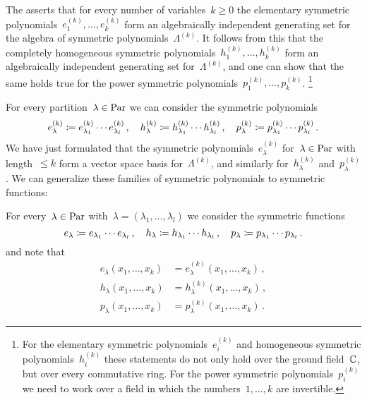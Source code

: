 \documentclass[a4paper,11pt]{scrartcl}
\begin{document}
The  asserts that for every number of variables~$k \geq 0$ the elementary symmetric polynomials~$e^{(k)}_1, \dotsc, e^{(k)}_k$ form an algebraically independent generating set for the algebra of symmetric polynomials~$\Lambda^{(k)}$.
It follows from this that the completely homogeneous symmetric polynomials~$h^{(k)}_1, \dotsc, h^{(k)}_k$ form an algebraically independent generating set for~$\Lambda^{(k)}$, and one can show that the same holds true for the power symmetric polynomials~$p^{(k)}_1, \dotsc, p^{(k)}_k$.%
\footnote{
  For the elementary symmetric polynomials~$e^{(k)}_i$ and homogeneous symmetric polynomials~$h^{(k)}_i$ these statements do not only hold over the ground field~$\mathbb{C}$, but over every commutative ring.
  For the power symmetric polynomials~$p^{(k)}_i$ we need to work over a field in which the numbers~$1, \dotsc, k$ are invertible.
}

For every partition~$\lambda \in \mathrm{Par}$ we can consider the symmetric polynomials
\[
  e^{(k)}_\lambda
  \coloneqq
  e^{(k)}_{\lambda_1} \dotsm e^{(k)}_{\lambda_l} \,,
  \quad
  h^{(k)}_\lambda
  \coloneqq
  h^{(k)}_{\lambda_1} \dotsm h^{(k)}_{\lambda_l} \,,
  \quad
  p^{(k)}_\lambda
  \coloneqq
  p^{(k)}_{\lambda_1} \dotsm p^{(k)}_{\lambda_l} \,.
\]
We have just formulated that the symmetric polynomials~$e^{(k)}_\lambda$ for~$\lambda \in \mathrm{Par}$ with length~$\leq k$ form a vector space basis for~$\Lambda^{(k)}$, and similarly for~$h^{(k)}_\lambda$ and~$p^{(k)}_\lambda$.
We can generalize these families of symmetric polynomials to symmetric functions:

\begin{example}
  For every~$\lambda \in \mathrm{Par}$ with~$\lambda = (\lambda_1, \dotsc, \lambda_l)$ we consider the symmetric functions
  \[
    e_\lambda
    \coloneqq
    e_{\lambda_1} \dotsm e_{\lambda_l} \,,
    \quad
    h_\lambda
    \coloneqq
    h_{\lambda_1} \dotsm h_{\lambda_l} \,,
    \quad
    p_\lambda
    \coloneqq
    p_{\lambda_1} \dotsm p_{\lambda_l} \,.
  \]
  and note that
  \begin{align*}
    e_\lambda(x_1, \dotsc, x_k)
    &=
    e^{(k)}_\lambda(x_1, \dotsc, x_k) \,,
    \\
    h_\lambda(x_1, \dotsc, x_k)
    &=
    h^{(k)}_\lambda(x_1, \dotsc, x_k) \,,
    \\
    p_\lambda(x_1, \dotsc, x_k)
    &=
    p^{(k)}_\lambda(x_1, \dotsc, x_k) \,.
  \end{align*}
\end{example}
\end{document}
